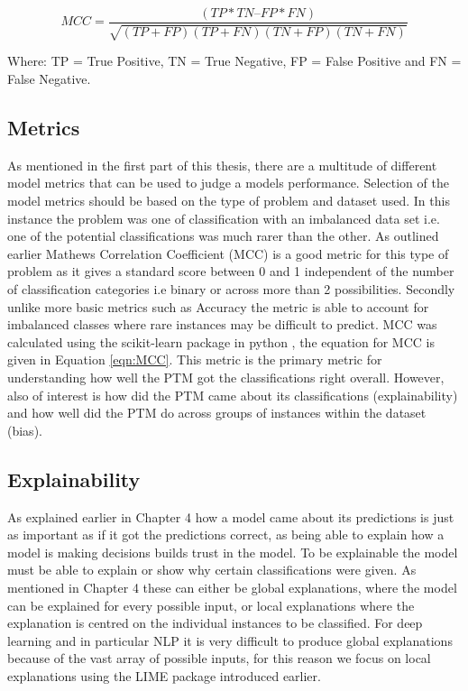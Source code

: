\begin{equation}
MCC =  \frac{(TP*TN – FP*FN)}{\sqrt{(TP+FP)(TP+FN)(TN+FP)(TN+FN)}}
\label{eqn:MCC}
\end{equation}

Where: TP = True Positive, TN = True Negative, FP = False Positive and FN = False Negative.


\subsection{Metrics} As mentioned in the first part of this thesis, there are a multitude of different model metrics that can be used to judge a models performance. Selection of the model metrics should be based on the type of problem and dataset used. In this instance the problem was one of classification with an imbalanced data set i.e. one of the potential classifications was much rarer than the other. As outlined earlier Mathews Correlation Coefficient (MCC) is a good metric for this type of problem as it gives a standard score between 0 and 1 independent of the number of classification categories i.e binary or across more than 2 possibilities. Secondly unlike more basic metrics such as Accuracy the metric is able to account for imbalanced classes where rare instances may be difficult to predict. MCC was calculated using the scikit-learn package in python \parencite{scikit-learn}, the equation for MCC is given in Equation \ref{eqn:MCC}. This metric is the primary metric for understanding how well the PTM got the classifications right overall. However,  also of interest is how did the PTM came about its classifications (explainability) and how well did the PTM do across groups of instances within the dataset (bias). 


\subsection{Explainability}As explained earlier in Chapter 4 how a model came about its predictions is just as important as if it got the predictions correct, as being able to explain how a model is making decisions builds trust in the model. To be explainable the model must be able to explain or show why certain classifications were given. As mentioned in Chapter 4 these can either be global explanations, where the model can be explained for every possible input, or local explanations where the explanation is centred on the individual instances to be classified. For deep learning and in particular NLP it is very difficult to produce global explanations because of the vast array of possible inputs, for this reason we focus on local explanations using the LIME package introduced earlier. 

